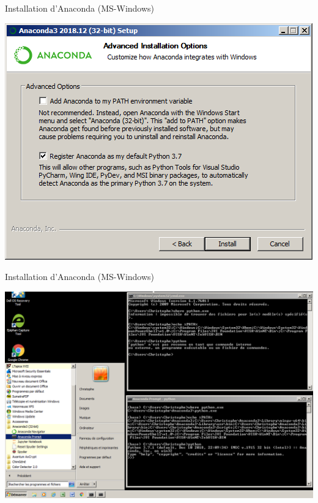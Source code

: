 \documentclass[10pt,aspectratio=169]{beamer}
\begin{document}
\begin{frame}{Installation d'Anaconda (MS-Windows)}
  \begin{center}
    \includegraphics[height = .8\textheight]{installation-anaconda-win-interaction-systeme}
  \end{center}
\end{frame}

\begin{frame}{Installation d'Anaconda (MS-Windows)}
  \begin{center}
    \includegraphics[height = .8\textheight]{anaconda-prompt-vs-cmd-windows.png}
  \end{center}
\end{frame}
\end{document}
